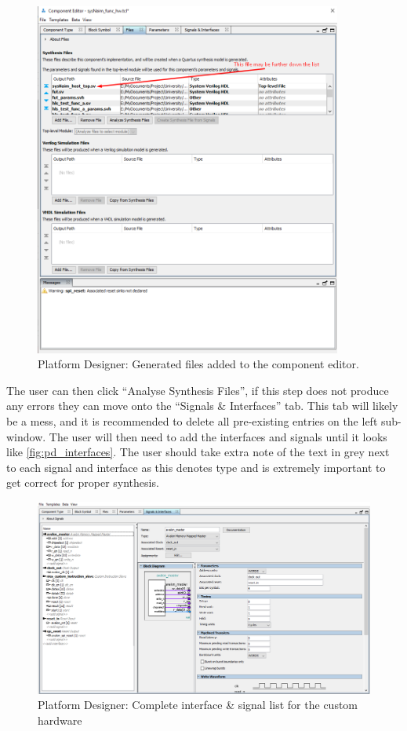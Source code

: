 \begin{figure}[!h]
    \centering
    \includegraphics[width=0.9\textwidth]{05_evaluation/images/pd_sys_files.png}
    \caption{Platform Designer: Generated files added to the component editor.}
    \label{fig:pd_files}
\end{figure}

The user can then click “Analyse Synthesis Files”, if this step does not produce any errors they can move onto the “Signals \& Interfaces” tab. This tab will likely be a mess, and it is recommended to delete all pre-existing entries on the left sub-window. The user will then need to add the interfaces and signals until it looks like \autoref{fig:pd_interfaces}. The user should take extra note of the text in grey next to each signal and interface as this denotes type and is extremely important to get correct for proper synthesis.

\begin{figure}[!h]
    \centering
    \includegraphics[width=1\textwidth]{05_evaluation/images/pd_interfaces.png}
    \caption{Platform Designer: Complete interface \& signal list for the custom hardware}
    \label{fig:pd_interfaces}
\end{figure}

